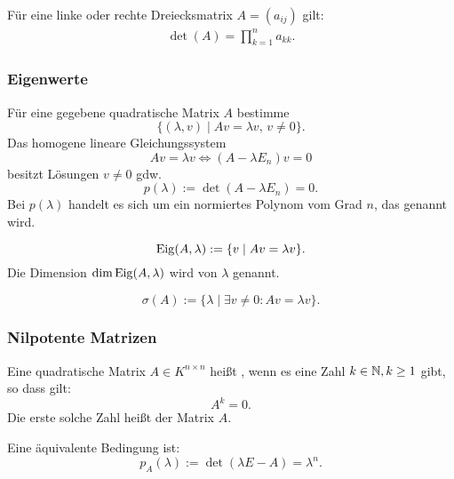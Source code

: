 Für eine linke oder rechte Dreiecksmatrix $A=(a_{ij})$ gilt:
\begin{gather}
\det(A) = \prod_{k=1}^n a_{kk}.
\end{gather}

\subsubsection{Eigenwerte}
Für eine gegebene quadratische Matrix $A$ bestimme
\begin{equation}
\{(\lambda,v)\mid Av = \lambda v,\,v\ne 0\}.
\end{equation}
Das homogene lineare Gleichungssystem
\begin{equation}
Av=\lambda v \iff (A-\lambda E_n)v=0
\end{equation}
besitzt Lösungen $v\ne 0$ gdw.
\begin{equation}
p(\lambda):=\det(A-\lambda E_n)=0.
\end{equation}
Bei $p(\lambda)$ handelt es sich um ein normiertes Polynom
vom Grad $n$, das 
genannt wird.

\begin{equation}
\operatorname*{Eig}(A,\lambda):=\{v\mid Av=\lambda v\}.
\end{equation}
Die Dimension $\dim\operatorname*{Eig}(A,\lambda)$ wird
von $\lambda$ genannt.

\begin{equation}
\sigma(A) := \{\lambda\mid \exists v\ne 0\colon Av=\lambda v\}.
\end{equation}

\subsubsection{Nilpotente Matrizen}
\begin{definition}
Eine quadratische Matrix $A\in K^{n\times n}$ heißt ,
wenn es eine Zahl $k\in\mathbb N, k\ge 1$ gibt, so dass gilt:
\begin{equation}
A^k=0.
\end{equation}
Die erste solche Zahl heißt  der Matrix $A$.

Eine äquivalente Bedingung ist:
\begin{equation}
p_A(\lambda):=\det(\lambda E-A)=\lambda^n.
\end{equation}
\end{definition}

